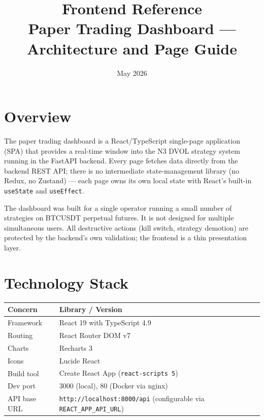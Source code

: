 \documentclass[12pt, a4paper]{article}
\title{\textbf{Frontend Reference}\\[0.5em]
\large Paper Trading Dashboard — Architecture and Page Guide}
\author{}
\date{May 2026}
\begin{document}
\maketitle
\tableofcontents
\newpage


\section{Overview}

The paper trading dashboard is a React/TypeScript single-page application (SPA)
that provides a real-time window into the N3 DVOL strategy system running in the
FastAPI backend. Every page fetches data directly from the backend REST API; there
is no intermediate state-management library (no Redux, no Zustand) — each page
owns its own local state with React's built-in \texttt{useState} and \texttt{useEffect}.

The dashboard was built for a single operator running a small number of strategies
on BTCUSDT perpetual futures. It is not designed for multiple simultaneous users.
All destructive actions (kill switch, strategy demotion) are protected by the
backend's own validation; the frontend is a thin presentation layer.


\section{Technology Stack}

\begin{table}[H]
\centering
\begin{tabular}{ll}
\toprule
Concern & Library / Version \\
\midrule
Framework       & React 19 with TypeScript 4.9 \\
Routing         & React Router DOM v7 \\
Charts          & Recharts 3 \\
Icons           & Lucide React \\
Build tool      & Create React App (\texttt{react-scripts 5}) \\
Dev port        & 3000 (local), 80 (Docker via nginx) \\
API base URL    & \texttt{http://localhost:8000/api} (configurable via \texttt{REACT\_APP\_API\_URL}) \\
\bottomrule
\end{tabular}
\end{table}
\end{document}
